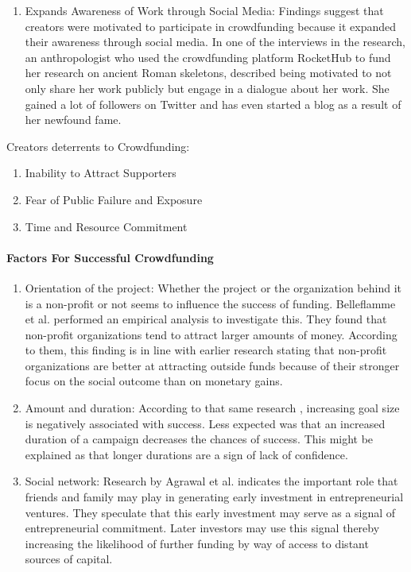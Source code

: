 \begin{enumerate}
      \item Expands Awareness  of Work  through Social Media:     
            Findings suggest that creators were motivated to
            participate in crowdfunding because it expanded their awareness through social media. In one of the
            interviews in the research, an anthropologist who used the crowdfunding platform RocketHub to fund
            her research on ancient Roman skeletons, described being motivated to not only share her work publicly but engage in a dialogue about her work. She gained a lot of followers on Twitter and has even
            started a blog as a result of her newfound fame.

\end{enumerate}

Creators deterrents to Crowdfunding:
\begin{enumerate}
      \item Inability to Attract Supporters
      \item Fear of Public Failure and Exposure
      \item Time and Resource Commitment
\end{enumerate}

\paragraph*{Factors For Successful Crowdfunding}
\begin{enumerate}
      \item Orientation of the project:     
            Whether the project or the organization behind it is a non-profit or not
            seems to influence the success of funding. Belleflamme et al. \cite{doi:10.1080/13691066.2013.785151} performed an empirical analysis
            to investigate this. They found that non-profit organizations tend to attract larger amounts of money.
            According to them, this finding is in line with earlier research stating that non-profit organizations
            are better at attracting outside funds because of their stronger focus on the social outcome than on
            monetary gains.

      \item Amount and duration:     
            According to that same research \cite{doi:10.1080/13691066.2013.785151}, increasing goal size is negatively associated
            with success. Less expected was that an increased duration of a campaign decreases the chances of
            success. This might be explained as that longer durations are a sign of lack of confidence.

      \item Social network:     
            Research by Agrawal et al. \cite{NBERw16820} indicates the important role that friends and family may
            play in generating early investment in entrepreneurial ventures. They speculate that this early investment may serve as a signal of entrepreneurial commitment. Later investors may use this signal thereby
            increasing the likelihood of further funding by way of access to distant sources of capital.
\end{enumerate}


